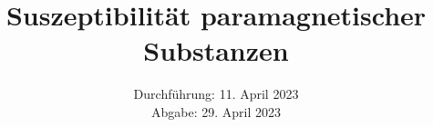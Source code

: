 

\subject{\texorpdfstring{\vspace{2ex}}{}V606\texorpdfstring{\vspace{-2ex}}{}} %
\title{Suszeptibilität paramagnetischer Substanzen} %
\date{
	Durchführung: 11. April 2023 %
	\\ Abgabe: 29. April 2023 %
}




\maketitle
\thispagestyle{empty}


\tableofcontents
\newpage







\printbibliography{}

\newpage



